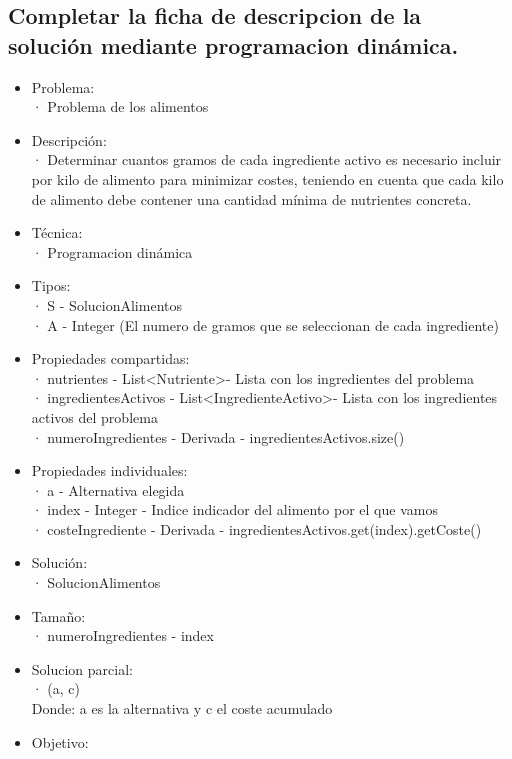 \documentclass[a4paper,12pt]{article}
\begin{document}
\subsection{Completar la ficha de descripcion de la solución mediante programacion dinámica.}
\begin{itemize}
  \item Problema:\\
        · Problema de los alimentos
  \item Descripción: \\
  · Determinar cuantos gramos de cada ingrediente activo es necesario incluir por kilo
  de alimento para minimizar costes, teniendo en cuenta que cada kilo de alimento debe
  contener una cantidad mínima de nutrientes concreta.
  \item Técnica:\\
        · Programacion dinámica
  \item Tipos:\\
        · S - SolucionAlimentos\\
        · A - Integer \in [0,1000] (El numero de gramos que se seleccionan de cada ingrediente)
  \item Propiedades compartidas:\\
        · nutrientes - List\textless Nutriente\textgreater - Lista con los ingredientes del problema\\
        · ingredientesActivos - List\textless IngredienteActivo\textgreater - Lista con los ingredientes activos del problema\\
        · numeroIngredientes - Derivada - ingredientesActivos.size()
  \item Propiedades individuales:\\
        · a - Alternativa elegida\\
        · index - Integer - Indice indicador del alimento por el que vamos\\
        · costeIngrediente - Derivada - ingredientesActivos.get(index).getCoste()
  \item Solución:\\
        · SolucionAlimentos
  \item Tamaño:\\
        · numeroIngredientes - index
  \item Solucion parcial:\\
        · (a, c)\\
        Donde: a es la alternativa y c el coste acumulado
  \item Objetivo:\\

\end{itemize}
\end{document}
